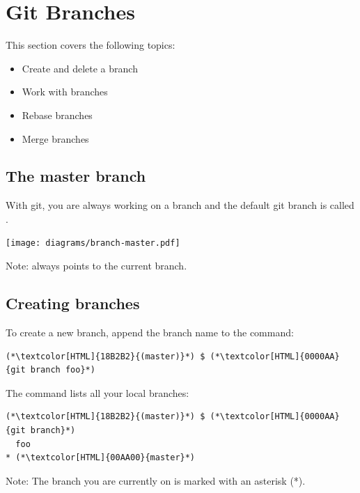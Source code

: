 \section{Git Branches}
\begin{frame}[fragile]
  \slidetitle

  This section covers the following topics:
  \begin{itemize}
    \pause
    \item Create and delete a branch
    \pause
    \item Work with branches
    \pause
    \item Rebase branches
    \pause
    \item Merge branches
  \end{itemize}
\end{frame}

\subsection{The master branch}
\begin{frame}[fragile]
  \subslidetitle

  With git, you are always working on a branch and the default git branch is called .
  \newline \vspace{1em}
  \centerline{\texttt{[image: diagrams/branch-master.pdf]}}

  \vspace{1.2em}
  Note:  always points to the current branch.

\end{frame}

\subsection{Creating branches}
\begin{frame}[fragile]
  \subslidetitle

  To create a new  branch, append the branch name to the  command:
  \begin{lstlisting}
(*\textcolor[HTML]{18B2B2}{(master)}*) $ (*\textcolor[HTML]{0000AA}{git branch foo}*)
\end{lstlisting}

  The  command lists all your local branches:
  \begin{lstlisting}
(*\textcolor[HTML]{18B2B2}{(master)}*) $ (*\textcolor[HTML]{0000AA}{git branch}*)
  foo
* (*\textcolor[HTML]{00AA00}{master}*)
\end{lstlisting}

Note: The branch you are currently on is marked with an asterisk (*).
\end{frame}

